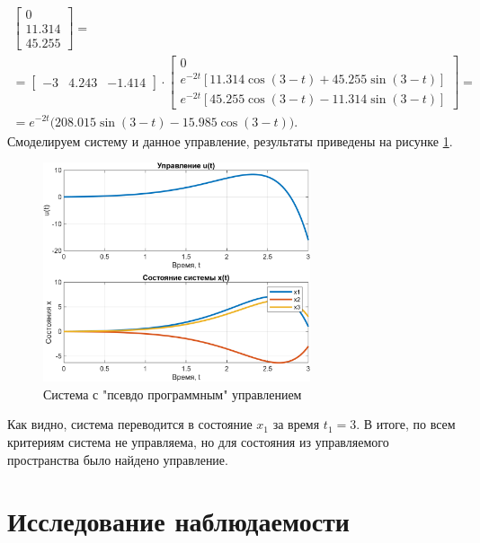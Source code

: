 \begin{multline*}
\begin{bmatrix}
        0 \\ 11.314 \\ 45.255
    \end{bmatrix}=\\
    =\begin{bmatrix}
        -3 & 4.243 & -1.414
    \end{bmatrix}\cdot
    \begin{bmatrix}
        0 \\ e^{-2t}[11.314\cos(3-t)+45.255\sin(3-t)] \\ e^{-2t}[45.255\cos(3-t)-11.314\sin(3-t)]
    \end{bmatrix}=\\
    =e^{-2t}\Big( 208.015\sin(3-t) - 15.985\cos(3-t) \Big).
\end{multline*}
Смоделируем систему и данное управление, результаты приведены на рисунке \ref{fig:task2}.
\begin{figure}[H]
    \centering
    \includegraphics[width=0.7\textwidth]{figs/task_2.png}
    \caption{Система с "псевдо программным" управлением}
    \label{fig:task2}
\end{figure}
Как видно, система переводится в состояние $x_1$ за время $t_1=3$.
В итоге, по всем критериям система не управляема, но для состояния из
управляемого пространства было найдено управление.


\section{Исследование наблюдаемости}
